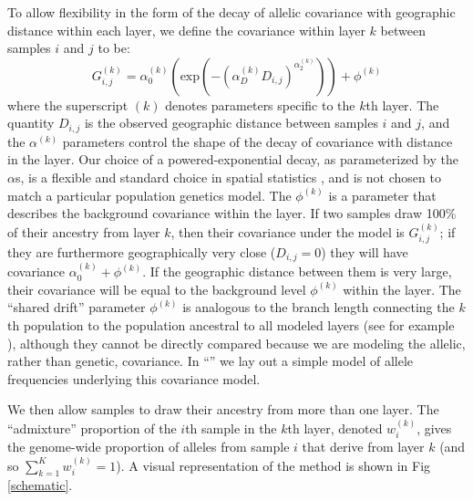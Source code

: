 \documentclass[10pt,letterpaper]{article}
\newcommand{\secref}[1]{``\nameref{#1}''}
\begin{document}
To allow flexibility in the form of the decay of allelic covariance with geographic distance within each layer, 
we define the covariance within layer $k$ between samples $i$ and $j$ to be:
\begin{equation}
G^{(k)}_{i,j} 
    = 
    \alpha^{(k)}_0 \left( \text{exp} \left( -(\alpha^{(k)}_D D_{i,j}) ^ {\alpha^{(k)}_2}	\right) \right) + \phi^{(k)}
\label{within_layer_covariance}
\end{equation}
where the superscript $(k)$ denotes parameters specific to the $k$th layer.
The quantity $D_{i,j}$ is the observed geographic distance between samples $i$ and $j$,
and the $\alpha^{(k)}$ parameters control the shape of the decay of
covariance with distance in the layer.
Our choice of a powered-exponential decay, 
as parameterized by the $\alpha$s, 
is a flexible and standard choice in spatial statistics \cite{Diggle1998}, 
and is not chosen to match a particular population genetics model. 
The $\phi^{(k)}$ is a parameter that describes the background covariance within the layer. 
If two samples draw 100\% of their ancestry from layer $k$, then their covariance under the model is $G^{(k)}_{i,j}$;
if they are furthermore geographically very close ($D_{i,j}=0$)
they will have covariance $\alpha^{(k)}_0 +  \phi^{(k)}$.
If the geographic distance between them is very large, 
their covariance will be equal to the background level $\phi^{(k)}$ within the layer.
The ``shared drift'' parameter $\phi^{(k)}$ is analogous to 
the branch length connecting the $k$th population to the population ancestral to all modeled
layers (see for example \cite{patterson_ancient_2012,peter_fstats}),
although they cannot be directly compared because 
we are modeling the allelic, rather than genetic, covariance. 
In \secref{rationale} we lay out a
simple model of allele frequencies underlying this covariance model.

We then allow samples to draw their ancestry from more than one layer.
The ``admixture'' proportion of the $i$th sample in the $k$th layer, denoted $w^{(k)}_i$,
gives the genome-wide proportion of alleles from sample $i$ that derive from
layer 
$k$ (and so $\sum_{k=1}^K w^{(k)}_i =1$).
A visual representation of the method is shown in Fig \ref{schematic}.
\end{document}
